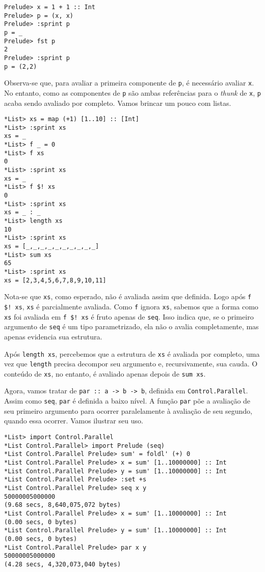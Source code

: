 \documentclass[a4paper]{article}
\begin{document}
\begin{verbatim}
Prelude> x = 1 + 1 :: Int
Prelude> p = (x, x)
Prelude> :sprint p
p = _
Prelude> fst p
2
Prelude> :sprint p
p = (2,2)
\end{verbatim}

Observa-se que, para avaliar a primeira componente de \texttt{p}, é necessário avaliar \texttt{x}.
No entanto, como as componentes de \texttt{p} são ambas referências para o \emph{thunk} de \texttt{x}, \texttt{p} acaba sendo avaliado por completo.
Vamos brincar um pouco com listas.

\begin{verbatim}
*List> xs = map (+1) [1..10] :: [Int]
*List> :sprint xs
xs = _
*List> f _ = 0
*List> f xs
0
*List> :sprint xs
xs = _
*List> f $! xs
0
*List> :sprint xs
xs = _ : _
*List> length xs
10
*List> :sprint xs
xs = [_,_,_,_,_,_,_,_,_,_]
*List> sum xs
65
*List> :sprint xs
xs = [2,3,4,5,6,7,8,9,10,11]
\end{verbatim}

Nota-se que \texttt{xs}, como esperado, não é avaliada assim que definida.
Logo após \texttt{f \$! xs}, \texttt{xs} é parcialmente avaliada.
Como \texttt{f} ignora \texttt{xs}, sabemos que a forma como \texttt{xs} foi avaliada em \texttt{f \$! xs} é fruto apenas de \texttt{seq}.
Isso indica que, se o primeiro argumento de \texttt{seq} é um tipo parametrizado, ela não o avalia completamente, mas apenas evidencia sua estrutura.

Após \texttt{length xs}, percebemos que a estrutura de \texttt{xs} é avaliada por completo, uma vez que \texttt{length} precisa decompor seu argumento e, recursivamente, sua cauda.
O conteúdo de \texttt{xs}, no entanto, é avaliado apenas depois de \texttt{sum xs}.

Agora, vamos tratar de \texttt{par :: a -> b -> b}, definida em \texttt{Control.Parallel}.
Assim como \texttt{seq}, \texttt{par} é definida a baixo nível.
A função \texttt{par} põe a avaliação de seu primeiro argumento para ocorrer paralelamente à avaliação de seu segundo, quando essa ocorrer.
Vamos ilustrar seu uso.

\begin{verbatim}
*List> import Control.Parallel
*List Control.Parallel> import Prelude (seq)
*List Control.Parallel Prelude> sum' = foldl' (+) 0
*List Control.Parallel Prelude> x = sum' [1..10000000] :: Int
*List Control.Parallel Prelude> y = sum' [1..10000000] :: Int
*List Control.Parallel Prelude> :set +s
*List Control.Parallel Prelude> seq x y
50000005000000
(9.68 secs, 8,640,075,072 bytes)
*List Control.Parallel Prelude> x = sum' [1..10000000] :: Int
(0.00 secs, 0 bytes)
*List Control.Parallel Prelude> y = sum' [1..10000000] :: Int
(0.00 secs, 0 bytes)
*List Control.Parallel Prelude> par x y
50000005000000
(4.28 secs, 4,320,073,040 bytes)
\end{verbatim}
\end{document}
